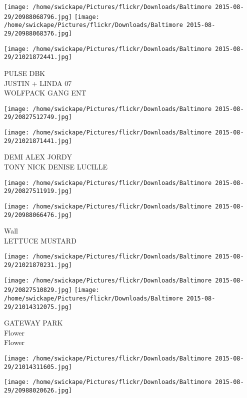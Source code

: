 \documentclass[10pt,letterpaper]{article}
\begin{document}
\texttt{[image: /home/swickape/Pictures/flickr/Downloads/Baltimore 2015-08-29/20988068796.jpg]}
\texttt{[image: /home/swickape/Pictures/flickr/Downloads/Baltimore 2015-08-29/20988068376.jpg]}

\texttt{[image: /home/swickape/Pictures/flickr/Downloads/Baltimore 2015-08-29/21021872441.jpg]}

PULSE DBK\\
JUSTIN + LINDA 07\\
WOLFPACK GANG ENT\\
\pagebreak

\texttt{[image: /home/swickape/Pictures/flickr/Downloads/Baltimore 2015-08-29/20827512749.jpg]}

\vspace{0.25in}
\texttt{[image: /home/swickape/Pictures/flickr/Downloads/Baltimore 2015-08-29/21021871441.jpg]}

DEMI ALEX JORDY\\
TONY NICK DENISE LUCILLE\\
\pagebreak

\texttt{[image: /home/swickape/Pictures/flickr/Downloads/Baltimore 2015-08-29/20827511919.jpg]}

\vspace{0.25in}
\texttt{[image: /home/swickape/Pictures/flickr/Downloads/Baltimore 2015-08-29/20988066476.jpg]}

Wall\\
LETTUCE MUSTARD\\
\pagebreak

\texttt{[image: /home/swickape/Pictures/flickr/Downloads/Baltimore 2015-08-29/21021870231.jpg]}

\vspace{0.25in}
\texttt{[image: /home/swickape/Pictures/flickr/Downloads/Baltimore 2015-08-29/20827510829.jpg]}
\texttt{[image: /home/swickape/Pictures/flickr/Downloads/Baltimore 2015-08-29/21014312075.jpg]}

GATEWAY PARK\\
Flower\\
Flower\\
\pagebreak

\texttt{[image: /home/swickape/Pictures/flickr/Downloads/Baltimore 2015-08-29/21014311605.jpg]}

\vspace{0.25in}
\texttt{[image: /home/swickape/Pictures/flickr/Downloads/Baltimore 2015-08-29/20988020626.jpg]}
\end{document}
